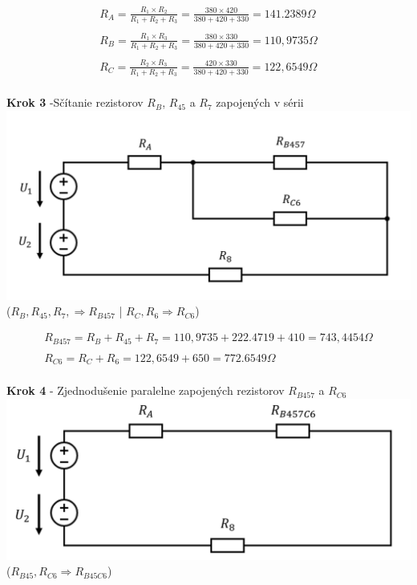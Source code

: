 \begin{gather*}
R_A = \frac{R_1 \times R_2}{R_1 + R_2 + R_3} =
\frac{380 \times 420}{380 + 420 + 330}=
141.2389 \Omega \\\\
R_B = \frac{R_1 \times R_3}{R_1 + R_2 + R_3} =
\frac{380 \times 330}{380 + 420 + 330} =
110,9735 \Omega \\\\
R_C = \frac{R_2 \times R_3}{R_1 + R_2 + R_3} =
\frac{420 \times 330}{380 + 420 + 330} =
122,6549 \Omega \\\
\end{gather*}

\begin{center}
\textbf{Krok 3} -Sčítanie rezistorov $R_B$, $R_{45}$ a $R_7$ zapojených v sérii
\includegraphics[scale=0.5,keepaspectratio]{fig/c3.png} \\
($R_B, R_45, R_7, \Rightarrow R_{B457}$ | $R_C, R_6 \Rightarrow R_{C6}$)
\end{center}

\begin{gather*}
R_{B457} = R_B + R_45 + R_7 =
110,9735 + 222.4719 + 410 =
743,4454 \Omega
\\\\
R_{C6} = R_C + R_6 =
122,6549 + 650 =
772.6549 \Omega
\\\
\end{gather*}
 
\newpage

\begin{center}
\textbf{Krok 4} - Zjednodušenie paralelne zapojených rezistorov $R_{B457}$ a $R_{C6}$ \\
\includegraphics[scale=0.5,keepaspectratio]{fig/c4.png} \\
($R_{B45}, R_{C6} \Rightarrow R_{B45C6}$)
\end{center}

